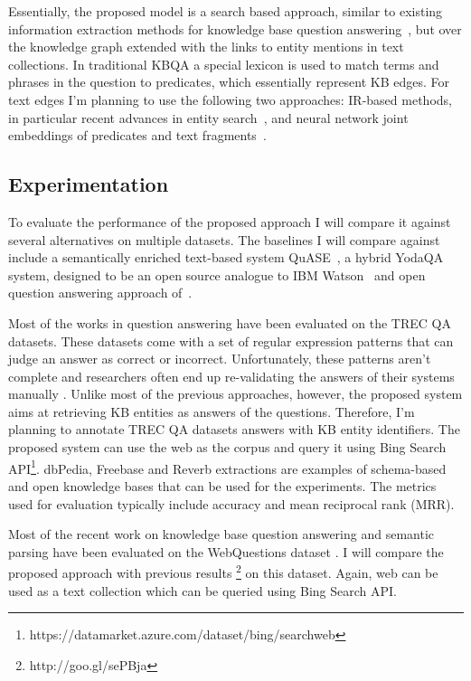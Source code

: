 Essentially, the proposed model is a search based approach, similar to existing information extraction methods for knowledge base question answering~\cite{YaoD14,bastmore:cikm:2015:aquu}, but over the knowledge graph extended with the links to entity mentions in text collections.
In traditional KBQA a special lexicon is used to match terms and phrases in the question to predicates, which essentially represent KB edges.
For text edges I'm planning to use the following two approaches: IR-based methods, in particular recent advances in entity search~\cite{zhiltsov2015fielded,nikolaev2016parameterized}, and neural network joint embeddings of predicates and text fragments~\cite{BordesCW14:emnlp,miller2016key}.

\subsection{Experimentation}
\label{section:factoid:proposal:experiments}

To evaluate the performance of the proposed approach I will compare it against several alternatives on multiple datasets.
The baselines I will compare against include a semantically enriched text-based system QuASE~\cite{Sun:2015:ODQ:2736277.2741651}, a hybrid YodaQA system, designed to be an open source analogue to IBM Watson~\cite{baudivs2015yodaqa} and open question answering approach of~\cite{Fader:2014:OQA:2623330.2623677}.

Most of the works in question answering have been evaluated on the TREC QA datasets.
These datasets come with a set of regular expression patterns that can judge an answer as correct or incorrect.
Unfortunately, these patterns aren't complete and researchers often end up re-validating the answers of their systems manually \cite{Sun:2015:ODQ:2736277.2741651,tsai2015web}.
Unlike most of the previous approaches, however, the proposed system aims at retrieving KB entities as answers of the questions.
Therefore, I'm planning to annotate TREC QA datasets answers with KB entity identifiers.
The proposed system can use the web as the corpus and query it using Bing Search API\footnote{https://datamarket.azure.com/dataset/bing/searchweb}.
dbPedia, Freebase and Reverb extractions \cite{FaderSE11} are examples of schema-based and open knowledge bases that can be used for the experiments.
The metrics used for evaluation typically include accuracy and mean reciprocal rank (MRR).

Most of the recent work on knowledge base question answering and semantic parsing have been evaluated on the WebQuestions dataset \cite{BerantCFL13:sempre}.
I will compare the proposed approach with previous results \footnote{http://goo.gl/sePBja} on this dataset.
Again, web can be used as a text collection which can be queried using Bing Search API.

